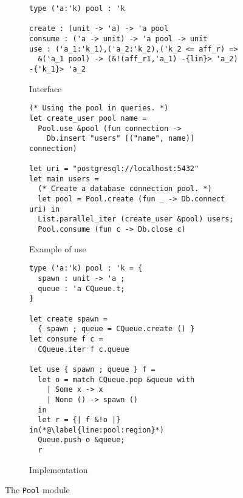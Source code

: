 \begin{figure}[tp]
  \centering
  \begin{subfigure}[t]{1\linewidth}
\begin{lstlisting}
type ('a:'k) pool : 'k

create : (unit -> 'a) -> 'a pool
consume : ('a -> unit) -> 'a pool -> unit
use : ('a_1:'k_1),('a_2:'k_2),('k_2 <= aff_r) =>
  &('a_1 pool) -> (&!(aff_r1,'a_1) -{lin}> 'a_2) -{'k_1}> 'a_2
\end{lstlisting}
    \vspace{-10pt}
    \caption{Interface}
    \label{intf:pool}

\begin{lstlisting}
(* Using the pool in queries. *)
let create_user pool name =
  Pool.use &pool (fun connection ->
    Db.insert "users" [("name", name)] connection)

let uri = "postgresql://localhost:5432"
let main users =
  (* Create a database connection pool. *)
  let pool = Pool.create (fun _ -> Db.connect uri) in
  List.parallel_iter (create_user &pool) users;
  Pool.consume (fun c -> Db.close c)
\end{lstlisting}
    \vspace{-10pt}
    \caption{Example of use}
    \label{ex:pool}
  \end{subfigure}

  \begin{subfigure}[t]{1\linewidth}
\begin{lstlisting}
type ('a:'k) pool : 'k = {
  spawn : unit -> 'a ;
  queue : 'a CQueue.t;
}

let create spawn =
  { spawn ; queue = CQueue.create () }
let consume f c =
  CQueue.iter f c.queue

let use { spawn ; queue } f =
  let o = match CQueue.pop &queue with
    | Some x -> x
    | None () -> spawn ()
  in
  let r = {| f &!o |} in(*@\label{line:pool:region}*)
  Queue.push o &queue;
  r
\end{lstlisting}
    \vspace{-15pt}
    \caption{Implementation}
    \label{impl:pool}
  \end{subfigure}

  \caption{The \texttt{Pool} module}
  \label{fig:pool}
\end{figure}



